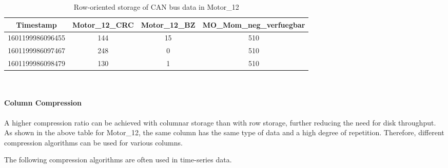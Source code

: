 \begin{table}[hbt!]
\centering
\begin{tabular}{|c|c|c|c|}
\hline
\textbf{Timestamp} & \textbf{Motor\_12\_CRC} & \textbf{Motor\_12\_BZ} & \textbf{MO\_Mom\_neg\_verfuegbar} \\ \hline
1601199986096455 & 144 & 15 & 510 \\ \hline
1601199986097467 & 248 & 0  & 510 \\ \hline
1601199986098479 & 130 & 1  & 510 \\ \hline
\end{tabular}%
\caption{Row-oriented storage of CAN bus data in Motor\_12}
\label{tab:row_oriented}
\end{table}


\begin{table}[hbt!]
\centering
{}
\end{table}

~\\
\paragraph{Column Compression}
A higher compression ratio can be achieved with columnar storage than with row storage, further reducing the need for disk throughput\cite[p.~97]{kleppmann2017designing}. As shown in the above table for Motor\_12, the same column has the same type of data and a high degree of repetition. Therefore, different compression algorithms can be used for various columns.

The following compression algorithms are often used in time-series data.

